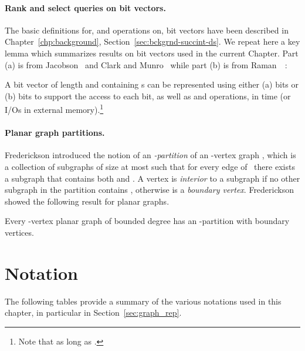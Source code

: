 \paragraph{Rank and select queries on bit vectors.}


The basic definitions for, and operations on, bit vectors have
been described in Chapter~\ref{chp:background}, 
Section~\ref{sec:bckgrnd-succint-ds}.
We repeat here a key lemma which summarizes results on
bit vectors used in the current Chapter.
Part (a) is from Jacobson~\cite{jac_1989} and Clark and 
Munro~\cite{clark_96}
while part (b) is from Raman~\etal~\cite{DBLP:journals/talg/RamanRS07}:

\begin{lemma}
  \label{lem:rank_select}
  A bit vector  of length  and containing  s can be
  represented using either (a)  bits or (b)  bits to support the access to each bit, as
  well as  and  operations, in  time (or
   I/Os in external memory).\footnote{Note that  as long as .}
\end{lemma}


\paragraph{Planar graph partitions.}


Frederickson \cite{Frederickson87} introduced the notion of an
\emph{-partition} of an -vertex graph , which is a collection of
 subgraphs of size at most  such that for every
edge  of~ there exists a subgraph that contains both  and .
A vertex  is \emph{interior} to a subgraph if no other
subgraph in the partition contains , otherwise  is a
\emph{boundary vertex}.
Frederickson showed the following result for planar graphs.

\begin{lemma}
  \label{lem:fred_graph_sep}
  Every -vertex planar graph of bounded degree has an -partition
  with  boundary vertices.
\end{lemma}


\section{Notation}\label{sec_notation}


The following tables provide a summary of the various notations used in this chapter,
in particular in Section~\ref{sec:graph_rep}.

